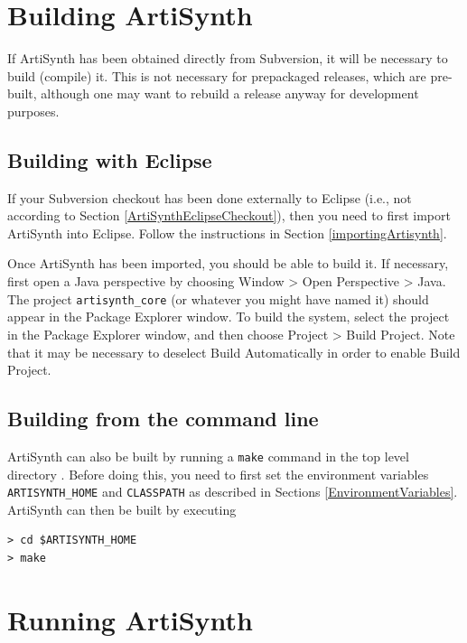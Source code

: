 \documentclass{article}
\def\directory{directory }
\begin{document}
\section{Building ArtiSynth}
\label{Building}

If ArtiSynth has been obtained directly from Subversion, it will be
necessary to build (compile) it. This is not necessary for prepackaged
releases, which are pre-built, although one may want to rebuild a
release anyway for development purposes.

\subsection{Building with Eclipse}
\label{BuildingWithEclipse}

If your Subversion checkout has been done externally to Eclipse (i.e.,
not according to Section \ref{ArtiSynthEclipseCheckout}), then you
need to first import ArtiSynth into Eclipse. Follow the instructions
in Section \ref{importingArtisynth}.

Once ArtiSynth has been imported, you should be able to build it.  If
necessary, first open a Java perspective by choosing {\sf Window >
Open Perspective > Java}. The project {\tt artisynth\_core} (or
whatever you might have named it) should appear in the {\sf Package
Explorer} window. To build the system, select the project in the {\sf
Package Explorer} window, and then choose {\sf Project > Build
Project}. Note that it may be necessary to deselect {\sf Build
Automatically} in order to enable {\sf Build Project}.

\subsection{Building from the command line}
\label{BuildingWithCygwin}

ArtiSynth can also be built by running a {\tt make} command in the top
level \directory. Before doing this, you need to first set the environment
variables {\tt ARTISYNTH\_HOME} and {\tt CLASSPATH} as described in
Sections \ref{EnvironmentVariables}. ArtiSynth can then be built by
executing

\begin{verbatim}
> cd $ARTISYNTH_HOME
> make
\end{verbatim}

\section{Running ArtiSynth}
\label{Running}
\end{document}
